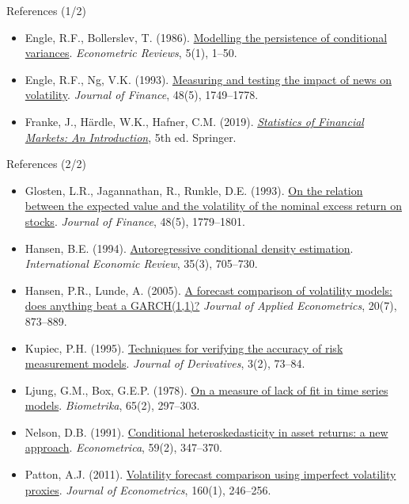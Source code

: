 \begin{frame}{References (1/2)}
\begin{itemize}
    \item Engle, R.F., Bollerslev, T. (1986). \href{https://doi.org/10.1080/07474938608800095}{Modelling the persistence of conditional variances}. \textit{Econometric Reviews}, 5(1), 1--50.
    \item Engle, R.F., Ng, V.K. (1993). \href{https://doi.org/10.1111/j.1540-6261.1993.tb05127.x}{Measuring and testing the impact of news on volatility}. \textit{Journal of Finance}, 48(5), 1749--1778.
    \item Franke, J., Härdle, W.K., Hafner, C.M. (2019). \href{https://doi.org/10.1007/978-3-030-13751-9}{\textit{Statistics of Financial Markets: An Introduction}}, 5th ed. Springer.
\end{itemize}
\end{frame}

\begin{frame}{References (2/2)}
\itemsize{\tiny}
\begin{itemize}
    \item Glosten, L.R., Jagannathan, R., Runkle, D.E. (1993). \href{https://doi.org/10.1111/j.1540-6261.1993.tb05128.x}{On the relation between the expected value and the volatility of the nominal excess return on stocks}. \textit{Journal of Finance}, 48(5), 1779--1801.
    \item Hansen, B.E. (1994). \href{https://doi.org/10.2307/2527081}{Autoregressive conditional density estimation}. \textit{International Economic Review}, 35(3), 705--730.
    \item Hansen, P.R., Lunde, A. (2005). \href{https://doi.org/10.1002/jae.800}{A forecast comparison of volatility models: does anything beat a GARCH(1,1)?} \textit{Journal of Applied Econometrics}, 20(7), 873--889.
    \item Kupiec, P.H. (1995). \href{https://doi.org/10.3905/jod.1995.407942}{Techniques for verifying the accuracy of risk measurement models}. \textit{Journal of Derivatives}, 3(2), 73--84.
    \item Ljung, G.M., Box, G.E.P. (1978). \href{https://doi.org/10.1093/biomet/65.2.297}{On a measure of lack of fit in time series models}. \textit{Biometrika}, 65(2), 297--303.
    \item Nelson, D.B. (1991). \href{https://doi.org/10.2307/2938260}{Conditional heteroskedasticity in asset returns: a new approach}. \textit{Econometrica}, 59(2), 347--370.
    \item Patton, A.J. (2011). \href{https://doi.org/10.1016/j.jeconom.2010.03.034}{Volatility forecast comparison using imperfect volatility proxies}. \textit{Journal of Econometrics}, 160(1), 246--256.

\end{itemize}
\end{frame}
